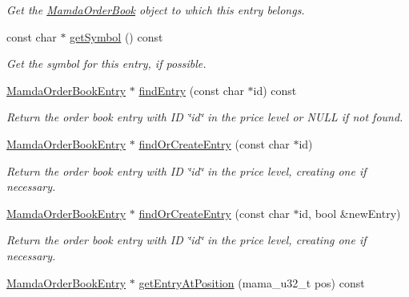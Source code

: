 \begin{CompactItemize}
\begin{CompactList}\small\item\em Get the \hyperlink{classWombat_1_1MamdaOrderBook}{Mamda\-Order\-Book} object to which this entry belongs. \item\end{CompactList}\item 
const char $\ast$ \hyperlink{classWombat_1_1MamdaOrderBookPriceLevel_922b3305222ba444308952f8c56bba58}{get\-Symbol} () const 
\begin{CompactList}\small\item\em Get the symbol for this entry, if possible. \item\end{CompactList}\item 
\hyperlink{classWombat_1_1MamdaOrderBookEntry}{Mamda\-Order\-Book\-Entry} $\ast$ \hyperlink{classWombat_1_1MamdaOrderBookPriceLevel_107fd7232398ee854da1c8cbae0acb88}{find\-Entry} (const char $\ast$id) const 
\begin{CompactList}\small\item\em Return the order book entry with ID \char`\"{}id\char`\"{} in the price level or NULL if not found. \item\end{CompactList}\item 
\hyperlink{classWombat_1_1MamdaOrderBookEntry}{Mamda\-Order\-Book\-Entry} $\ast$ \hyperlink{classWombat_1_1MamdaOrderBookPriceLevel_17859a5dd71e73c98f85383e908f36c6}{find\-Or\-Create\-Entry} (const char $\ast$id)
\begin{CompactList}\small\item\em Return the order book entry with ID \char`\"{}id\char`\"{} in the price level, creating one if necessary. \item\end{CompactList}\item 
\hyperlink{classWombat_1_1MamdaOrderBookEntry}{Mamda\-Order\-Book\-Entry} $\ast$ \hyperlink{classWombat_1_1MamdaOrderBookPriceLevel_b84ac5db71f02aa1064b15eaf4118891}{find\-Or\-Create\-Entry} (const char $\ast$id, bool \&new\-Entry)
\begin{CompactList}\small\item\em Return the order book entry with ID \char`\"{}id\char`\"{} in the price level, creating one if necessary. \item\end{CompactList}\item 
\hyperlink{classWombat_1_1MamdaOrderBookEntry}{Mamda\-Order\-Book\-Entry} $\ast$ \hyperlink{classWombat_1_1MamdaOrderBookPriceLevel_65d00d9d3759481b617d967d6d9ad808}{get\-Entry\-At\-Position} (mama\_\-u32\_\-t pos) const 

\end{CompactItemize}
